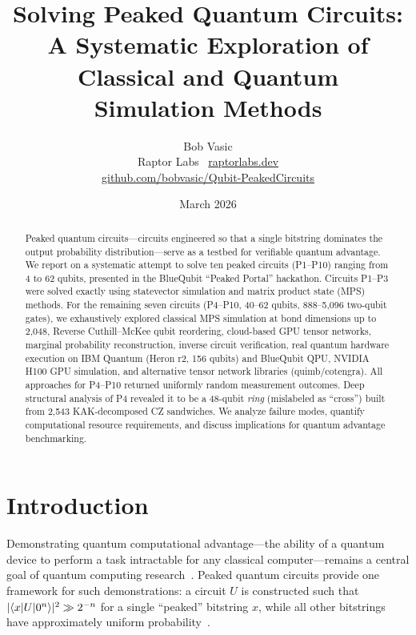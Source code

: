 \documentclass[11pt,a4paper]{article}
\title{\LARGE\textbf{Solving Peaked Quantum Circuits:}\\[0.3em]
\Large A Systematic Exploration of Classical and Quantum\\Simulation Methods}
\author{Bob Vasic\\[0.3em]
\small Raptor Labs \textbar\ \href{https://raptorlabs.dev}{raptorlabs.dev}\\
\small \href{https://github.com/bobvasic/Qubit-PeakedCircuits}{github.com/bobvasic/Qubit-PeakedCircuits}}
\date{March 2026}
\begin{document}
\maketitle
\thispagestyle{fancy}

\begin{abstract}
Peaked quantum circuits---circuits engineered so that a single bitstring dominates the output probability distribution---serve as a testbed for verifiable quantum advantage. We report on a systematic attempt to solve ten peaked circuits (P1--P10) ranging from 4 to 62 qubits, presented in the BlueQubit ``Peaked Portal'' hackathon. Circuits P1--P3 were solved exactly using statevector simulation and matrix product state (MPS) methods. For the remaining seven circuits (P4--P10, 40--62 qubits, 888--5{,}096 two-qubit gates), we exhaustively explored classical MPS simulation at bond dimensions up to 2{,}048, Reverse Cuthill--McKee qubit reordering, cloud-based GPU tensor networks, marginal probability reconstruction, inverse circuit verification, real quantum hardware execution on IBM Quantum (Heron r2, 156 qubits) and BlueQubit QPU, NVIDIA H100 GPU simulation, and alternative tensor network libraries (quimb/cotengra). All approaches for P4--P10 returned uniformly random measurement outcomes. Deep structural analysis of P4 revealed it to be a 48-qubit \emph{ring} (mislabeled as ``cross'') built from 2{,}543 KAK-decomposed CZ sandwiches. We analyze failure modes, quantify computational resource requirements, and discuss implications for quantum advantage benchmarking.
\end{abstract}

\section{Introduction}
\label{sec:intro}

Demonstrating quantum computational advantage---the ability of a quantum device to perform a task intractable for any classical computer---remains a central goal of quantum computing research~\cite{arute2019quantum,zhong2020quantum}. Peaked quantum circuits provide one framework for such demonstrations: a circuit $U$ is constructed such that $|\!\braket{x|U|0^n}\!|^2 \gg 2^{-n}$ for a single ``peaked'' bitstring $x$, while all other bitstrings have approximately uniform probability~\cite{aaronson2017complexity}.
\end{document}
